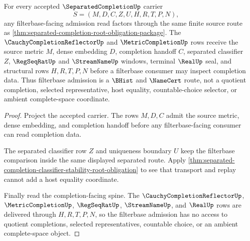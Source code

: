 \begin{theorem}
\label{thm:separated-completion-filterbase-admission}
For every accepted $\SeparatedCompletionUp$ carrier
$$
S=(M,D,C,Z,U,H,R,T,P,N),
$$
any filterbase-facing admission read factors through the same finite source route as \autoref{thm:separated-completion-root-obligation-package}. The $\CauchyCompletionReflectorUp$ and $\MetricCompletionUp$ rows receive the source metric $M$, dense embedding $D$, completion handoff $C$, separated classifier $Z$, $\RegSeqRatUp$ and $\StreamNameUp$ windows, terminal $\RealUp$ seal, and structural rows $H,R,T,P,N$ before a filterbase consumer may inspect completion data. Thus filterbase admission is a $\BHist$ and $\NameCert$ route, not a quotient completion, selected representative, host equality, countable-choice selector, or ambient complete-space coordinate.
\end{theorem}
\begin{proof}
Project the accepted carrier. The rows $M,D,C$ admit the source metric, dense embedding, and completion handoff before any filterbase-facing consumer can read completion data.

The separated classifier row $Z$ and uniqueness boundary $U$ keep the filterbase comparison inside the same displayed separated route. Apply \autoref{thm:separated-completion-classifier-stability-root-obligation} to see that transport and replay cannot add a host equality coordinate.

Finally read the completion-facing spine. The $\CauchyCompletionReflectorUp$, $\MetricCompletionUp$, $\RegSeqRatUp$, $\StreamNameUp$, and $\RealUp$ rows are delivered through $H,R,T,P,N$, so the filterbase admission has no access to quotient completions, selected representatives, countable choice, or an ambient complete-space object.
\end{proof}

